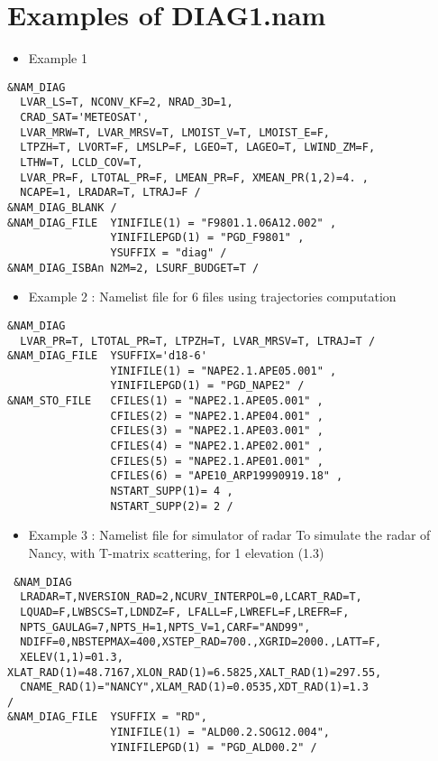 \section{Examples of DIAG1.nam } \label{ss:diag_ex}
\begin{itemize}
\item Example 1 
\end{itemize}

\begin{verbatim}
&NAM_DIAG 
  LVAR_LS=T, NCONV_KF=2, NRAD_3D=1, 
  CRAD_SAT='METEOSAT',
  LVAR_MRW=T, LVAR_MRSV=T, LMOIST_V=T, LMOIST_E=F,
  LTPZH=T, LVORT=F, LMSLP=F, LGEO=T, LAGEO=T, LWIND_ZM=F,
  LTHW=T, LCLD_COV=T, 
  LVAR_PR=F, LTOTAL_PR=F, LMEAN_PR=F, XMEAN_PR(1,2)=4. ,
  NCAPE=1, LRADAR=T, LTRAJ=F /
&NAM_DIAG_BLANK /
&NAM_DIAG_FILE  YINIFILE(1) = "F9801.1.06A12.002" ,
                YINIFILEPGD(1) = "PGD_F9801" ,
                YSUFFIX = "diag" /
&NAM_DIAG_ISBAn N2M=2, LSURF_BUDGET=T /
\end{verbatim}

\begin{itemize}
\item Example 2 : Namelist file for 6 files using trajectories computation
\end{itemize}

\begin{verbatim}
&NAM_DIAG 
  LVAR_PR=T, LTOTAL_PR=T, LTPZH=T, LVAR_MRSV=T, LTRAJ=T /
&NAM_DIAG_FILE  YSUFFIX='d18-6'
                YINIFILE(1) = "NAPE2.1.APE05.001" ,
                YINIFILEPGD(1) = "PGD_NAPE2" /
&NAM_STO_FILE   CFILES(1) = "NAPE2.1.APE05.001" ,
                CFILES(2) = "NAPE2.1.APE04.001" ,
                CFILES(3) = "NAPE2.1.APE03.001" ,
                CFILES(4) = "NAPE2.1.APE02.001" ,
                CFILES(5) = "NAPE2.1.APE01.001" ,
                CFILES(6) = "APE10_ARP19990919.18" ,
                NSTART_SUPP(1)= 4 , 
                NSTART_SUPP(2)= 2 /
\end{verbatim}
\newpage
\begin{itemize}
\item Example 3 : Namelist file for simulator of radar To simulate the radar of Nancy, with T-matrix scattering, for 1 elevation (1.3)
\end{itemize}

\begin{verbatim}
 &NAM_DIAG
  LRADAR=T,NVERSION_RAD=2,NCURV_INTERPOL=0,LCART_RAD=T,
  LQUAD=F,LWBSCS=T,LDNDZ=F, LFALL=F,LWREFL=F,LREFR=F,
  NPTS_GAULAG=7,NPTS_H=1,NPTS_V=1,CARF="AND99",
  NDIFF=0,NBSTEPMAX=400,XSTEP_RAD=700.,XGRID=2000.,LATT=F,
  XELEV(1,1)=01.3, XLAT_RAD(1)=48.7167,XLON_RAD(1)=6.5825,XALT_RAD(1)=297.55,
  CNAME_RAD(1)="NANCY",XLAM_RAD(1)=0.0535,XDT_RAD(1)=1.3
/
&NAM_DIAG_FILE  YSUFFIX = "RD",
                YINIFILE(1) = "ALD00.2.SOG12.004",
                YINIFILEPGD(1) = "PGD_ALD00.2" /
\end{verbatim}

